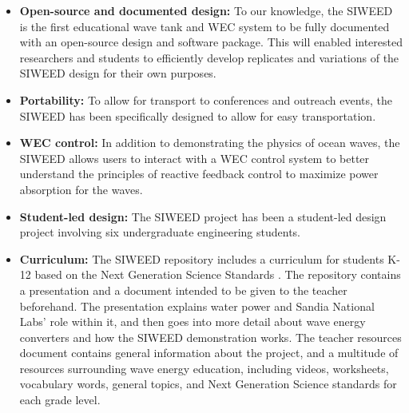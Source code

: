 \documentclass[11pt, letterpaper]{article}
\begin{document}
\begin{itemize}
  \item \textbf{Open-source and documented design:} To our knowledge, the SIWEED is the first educational wave tank and WEC system to be fully documented with an open-source design and software package.
  This will enabled interested researchers and students to efficiently develop replicates and variations of the SIWEED design for their own purposes.
  \item \textbf{Portability:} To allow for transport to conferences and outreach events, the SIWEED has been specifically designed to allow for easy transportation.
  \item \textbf{WEC control:} In addition to demonstrating the physics of ocean waves, the SIWEED allows users to interact with a WEC control system to better understand the principles of reactive feedback control to maximize power absorption for the waves.
  \item \textbf{Student-led design:} The SIWEED project has been a student-led design project involving six undergraduate engineering students.
  \item \textbf{Curriculum:} The SIWEED repository includes a curriculum for students K-12 based on the Next Generation Science Standards \cite{NextGenScience}. 
The repository contains a presentation and a document intended to be given to the teacher beforehand. 
The presentation explains water power and Sandia National Labs' role within it, and then goes into more detail about wave energy converters and how the SIWEED demonstration works.
The teacher resources document contains general information about the project, and a multitude of resources surrounding wave energy education, including videos, worksheets, vocabulary words, general topics, and Next Generation Science standards for each grade level.
\end{itemize}
\end{document}
